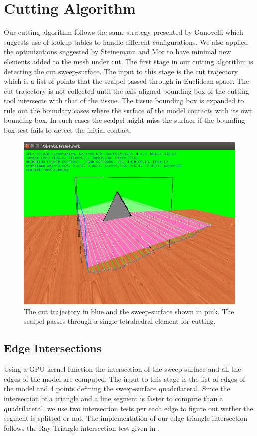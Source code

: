 \section{Cutting Algorithm}
Our cutting algorithm follows the same strategy presented by Ganovelli \etal \cite{Ganovelli2000} which suggests use of lookup tables to 
handle different configurations. We also applied the optimizations suggested by
Steinemann and Mor \etal \cite{Steinemann, Mor2000} to have minimal new elements added to the mesh under cut. 
The first stage in our cutting algorithm is detecting the cut sweep-surface. The input to this stage is the cut trajectory which is a list of points
that the scalpel passed through in Euclidean space. The cut trajectory is not collected until the axis-aligned bounding box of the cutting tool intersects
with that of the tissue. The tissue bounding box is expanded to rule out the boundary cases where the surface of the model contacts with its own bounding 
box. In such cases the scalpel might miss the surface if the bounding box test fails to detect the initial contact. 

\begin{figure}[H]
  \centering
  \includegraphics[width=0.8\linewidth]{figures/cutting/sweep_surface.png}
  \caption{\label{fig:sweepsurf}
  {The cut trajectory in blue and the sweep-surface shown in pink. The scalpel passes through a single 
  tetrahedral element for cutting.}
}
\end{figure}

\subsection{Edge Intersections}
Using a GPU kernel function the intersection of the sweep-surface and all the edges of the model are computed. 
The input to this stage is the list of edges of the model and 4 points defining the sweep-surface quadrilateral. 
Since the intersection of a triangle and a line segment is faster to compute than a quadrilateral, we 
use two intersection tests per each edge to figure out wether the segment is splitted or not. The implementation
of our edge triangle intersection follows the Ray-Triangle intersection test given in \cite{RTR3}.


